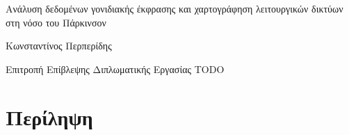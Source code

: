 \documentclass[12pt]{article}
\begin{document}
    \begin{titlepage}
        \begin{center}
            \Large{Ανάλυση δεδομένων γονιδιακής έκφρασης και χαρτογράφηση λειτουργικών δικτύων στη νόσο του Πάρκινσον}
        \end{center}
        \vspace{16mm}
        \begin{center}
            Κωνσταντίνος Περπερίδης
        \end{center}
        \vspace{16mm}
        \begin{center}
            Επιτροπή Επίβλεψης Διπλωματικής Εργασίας
            TODO
        \end{center}
    \end{titlepage}
    \section{Περίληψη}
\end{document}
